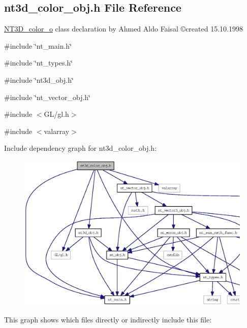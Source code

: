 \subsection{nt3d\_\-color\_\-obj.h File Reference}
\label{nt3d__color__obj_8h}



\begin{DoxyItemize}
\item \hyperlink{class_n_t3_d__color__o}{NT3D\_\-color\_\-o} class declaration by Ahmed Aldo Faisal \copyright created 15.10.1998 
\end{DoxyItemize} 


{\ttfamily \#include \char`\"{}nt\_\-main.h\char`\"{}}\par
{\ttfamily \#include \char`\"{}nt\_\-types.h\char`\"{}}\par
{\ttfamily \#include \char`\"{}nt3d\_\-obj.h\char`\"{}}\par
{\ttfamily \#include \char`\"{}nt\_\-vector\_\-obj.h\char`\"{}}\par
{\ttfamily \#include $<$GL/gl.h$>$}\par
{\ttfamily \#include $<$valarray$>$}\par
Include dependency graph for nt3d\_\-color\_\-obj.h:
\nopagebreak
\begin{figure}[H]
\begin{center}
\leavevmode
\includegraphics[width=400pt]{nt3d__color__obj_8h__incl}
\end{center}
\end{figure}
This graph shows which files directly or indirectly include this file:
\nopagebreak
